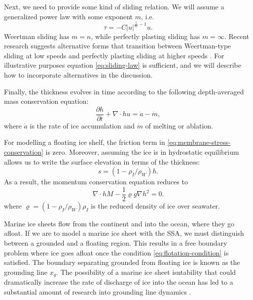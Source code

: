 \documentclass{article}
\theoremstyle{definition}
\theoremstyle{plain}
\begin{document}
Next, we need to provide some kind of sliding relation.
We will assume a generalized power law with some exponent $m$, i.e.
\begin{equation}
    \tau = -C|u|^{\frac{1}{m} - 1}u.
    \label{eq:sliding-law}
\end{equation}
Weertman sliding has $m = n$, while perfectly plasting sliding has $m = \infty$.
Recent research suggests alternative forms that transition between Weertman-type sliding at low speeds and perfectly plasting sliding at higher speeds \citep{minchew2020toward}.
For illustrative purposes equation \eqref{eq:sliding-law} is sufficient, and we will describe how to incorporate alternatives in the discussion.

Finally, the thickness evolves in time according to the following depth-averaged mass conservation equation:
\begin{equation}
	\frac{\partial h}{\partial t} + \nabla \cdot hu = \dot a - \dot m,
	\label{eq:conservation-mass}
\end{equation}
where $\dot a$ is the rate of ice accumulation and $\dot m$ of melting or ablation.

For modelling a floating ice shelf, the friction term in \eqref{eq:membrane-stress-conservation} is zero.
Moreover, assuming the ice is in hydrostatic equilibrium allows us to write the surface elevation in terms of the thickness:
\begin{equation}
    s = (1 - \rho_I / \rho_W) h.
    \label{eq:flotation-condition}
\end{equation}
As a result, the momentum conservation equation reduces to
\begin{equation}
    \nabla\cdot hM - \frac{1}{2}\varrho g\nabla h^2 = 0.
\end{equation}
where $\varrho = (1 - \rho_I / \rho_W)\rho_I$ is the reduced density of ice over seawater.

Marine ice sheets flow from the continent and into the ocean, where they go afloat.
If we are to model a marine ice sheet with the SSA, we must distinguish between a grounded and a floating region.
This results in a free boundary problem where ice goes afloat once the condition \eqref{eq:flotation-condition} is satisfied.
The boundary separating grounded from floating ice is known as the grounding line $x_g$.
The possibility of a marine ice sheet isntability that could dramatically increase the rate of discharge of ice into the ocean has led to a substantial amount of research into grounding line dynamics \citep{schoof2007mis, durand2009mis, favier2012mis}.
\end{document}
